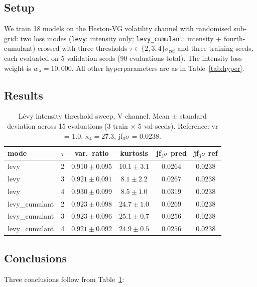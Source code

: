 \documentclass[review,12pt]{elsarticle}
\begin{document}
\subsection{Setup}

We train 18 models on the Heston-VG volatility channel with
randomised sub-grid: two loss modes
(\texttt{levy}: intensity only; \texttt{levy\_cumulant}: intensity
+ fourth-cumulant) crossed with three thresholds
\(\tau \in \{2, 3, 4\}\sigma_{\mathrm{ref}}\) and three training
seeds, each evaluated on 5 validation seeds (90 evaluations
total). The intensity loss weight is \(w_\lambda = 10{,}000\).
All other hyperparameters are as in Table~\ref{tab:hyper}.

\subsection{Results}

\begin{table}[h]
\centering
\caption{L\'evy intensity threshold sweep, V channel. Mean
$\pm$ standard deviation across 15 evaluations (3 train
$\times$ 5 val seeds). Reference: vr = 1.0,
$\kappa_4 = 27.3$, jf\(_3\sigma\) = 0.0238.}
\label{tab:levy-tau}
\begin{tabular}{l c c c c c}
\toprule
mode & $\tau$ & var.\ ratio & kurtosis & jf\(_3\sigma\) pred & jf\(_3\sigma\) ref \\
\midrule
levy & 2 & $0.910 \pm 0.095$ & $10.1 \pm 3.1$ & $0.0264$ & $0.0238$ \\
levy & 3 & $0.921 \pm 0.091$ & $8.1 \pm 2.2$ & $0.0267$ & $0.0238$ \\
levy & 4 & $0.930 \pm 0.099$ & $8.5 \pm 1.0$ & $0.0319$ & $0.0238$ \\
\midrule
levy\_cumulant & 2 & $0.923 \pm 0.098$ & $24.7 \pm 1.0$ & $0.0269$ & $0.0238$ \\
levy\_cumulant & 3 & $0.923 \pm 0.096$ & $25.1 \pm 0.7$ & $0.0256$ & $0.0238$ \\
levy\_cumulant & 4 & $0.921 \pm 0.092$ & $24.9 \pm 0.5$ & $0.0256$ & $0.0238$ \\
\bottomrule
\end{tabular}
\end{table}

\subsection{Conclusions}

Three conclusions follow from Table~\ref{tab:levy-tau}:
\end{document}
